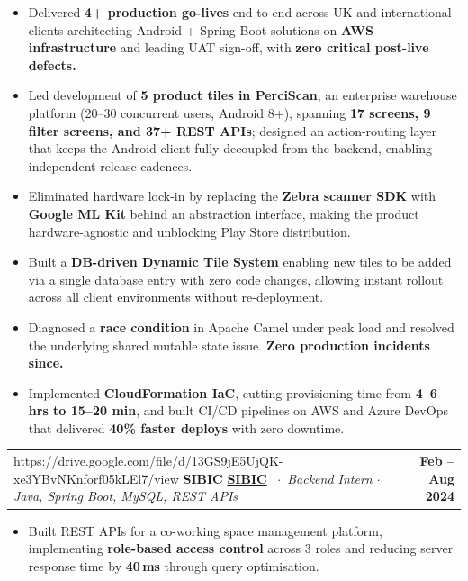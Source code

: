 \documentclass[10pt, letterpaper]{article}
\makeatletter
\newcommand{\role}[4]{%
  \noindent
  \begin{tabularx}{\linewidth}{@{}X r@{}}
    \ifx\relax#2\relax
      {\small\bfseries\color{NavyTx}#1}
    \else
      {\small\bfseries\href{#2}{\color{BlueAc}#1}}%
    \fi
    {\footnotesize\color{MetaTx}\ $\cdot$\ \textit{#3}}
    &
    {\footnotesize\bfseries\color{NavyTx}#4}
  \end{tabularx}\vspace{0pt}%
}
\newenvironment{blist}{%
  \begin{itemize}[
    leftmargin=1.1em,
    itemsep=0pt,
    topsep=0pt,
    parsep=0pt,
    label={\textcolor{BlueAc}{\small$\bullet$}}
  ]\small\color{BodyTx}
}{%
  \end{itemize}\vspace{0pt}
}
\newcommand{\bn}[1]{{\bfseries\color{NavyTx}#1}}
\makeatother
\begin{document}
\begin{blist}
  \item Delivered \bn{4+ production go-lives} end-to-end across UK and international clients
        architecting Android + Spring Boot solutions on \bn{AWS infrastructure} and leading UAT sign-off,
        with \bn{zero critical post-live defects.}

  \item Led development of \bn{5 product tiles in PerciScan}, an enterprise warehouse platform
        (20–30 concurrent users, Android 8+), spanning \bn{17 screens, 9 filter screens, and 37+ REST APIs};
        designed an action-routing layer that keeps the Android client fully decoupled from the backend,
        enabling independent release cadences.

  \item Eliminated hardware lock-in by replacing the \bn{Zebra scanner SDK} with \bn{Google ML Kit}
        behind an abstraction interface, making the product hardware-agnostic and unblocking
        Play Store distribution.

  \item Built a \bn{DB-driven Dynamic Tile System} enabling new tiles to be added via a single
        database entry with zero code changes, allowing instant rollout across all client
        environments without re-deployment.

  \item Diagnosed a \bn{race condition} in Apache Camel under peak load and resolved the underlying
        shared mutable state issue. \bn{Zero production incidents since.}

  \item Implemented \bn{CloudFormation IaC}, cutting provisioning time from \bn{4–6 hrs to 15–20 min},
        and built CI/CD pipelines on AWS and Azure DevOps that delivered \bn{40\% faster deploys}
        with zero downtime.
\end{blist}

\role{SIBIC}{https://drive.google.com/file/d/13GS9jE5UjQK-xe3YBvNKnforf05kLEl7/view}%
     {Backend Intern $\cdot$ Java, Spring Boot, MySQL, REST APIs}%
     {Feb – Aug 2024}

\begin{blist}
  \item Built REST APIs for a co-working space management platform, implementing
        \bn{role-based access control} across 3 roles and reducing server response time by
        \bn{40\,ms} through query optimisation.
\end{blist}
\end{document}
